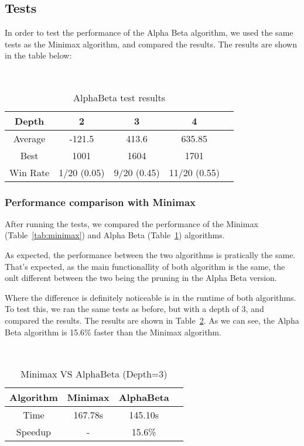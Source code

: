 \documentclass{article}
\begin{document}
\subsection{Tests}

In order to test the performance of the Alpha Beta algorithm, we used the same tests as the Minimax algorithm, and compared the results. The results are shown in the table below:

~\\
\begin{table}[!ht]
  \begin{center}
    \begin{tabular}{||c||c|c|c|c||}
      \hline
      Depth & 2 & 3 & 4 \\
      \hline\hline
      Average &  -121.5 &  413.6 &  635.85 \\
      \hline\hline
      Best & 1001 & 1604 & 1701 \\
      \hline\hline
      Win Rate & 1/20 (0.05) & 9/20 (0.45) & 11/20 (0.55) \\
      \hline
    \end{tabular}
    \caption{AlphaBeta test results}
    \label{tab:alphabeta}
  \end{center}
\end{table}

\subsubsection{Performance comparison with Minimax}
After running the tests, we compared the performance of the Minimax (Table~\ref{tab:minimax}) and Alpha Beta (Table~\ref{tab:alphabeta}) algorithms.

As expected, the performance between the two algorithms is pratically the same. That's expected, as the main functionallity of both algorithm is the same, the onlt different between the two being the pruning in the Alpha Beta version.

Where the difference is definitely noticeable is in the runtime of both algorithms. To test this, we ran the same tests as before, but with a depth of 3, and compared the results. The results are shown in Table~\ref{tab:minimax_vs_alphabeta}. As we can see, the Alpha Beta algorithm is 15.6\% faster than the Minimax algorithm.

~\\
\begin{table}[!ht]
  \begin{center}
    \begin{tabular}{||c||c|c|c||}
      \hline
      Algorithm & Minimax & AlphaBeta \\
      \hline\hline
      Time & 167.78s & 145.10s \\
      \hline\hline
      Speedup & - & 15.6\% \\
      \hline
    \end{tabular}
    \caption{Minimax VS AlphaBeta (Depth=3)}
    \label{tab:minimax_vs_alphabeta}
  \end{center}
\end{table}
\end{document}
